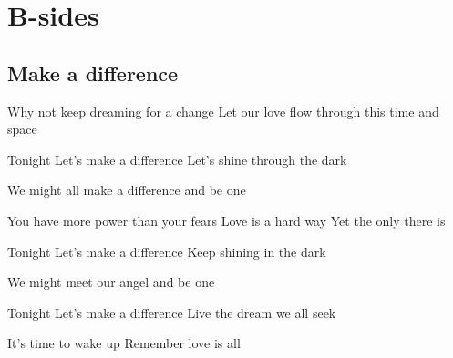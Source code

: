 \documentclass{article}
\newenvironment{album}[1]%
{%
  \section*{#1}
}%
{%
}
\newenvironment{song}[1]%
{%
  \subsection*{\textbf{#1}}
  \begin{multicols*}{2}
}%
{%
  \end{multicols*}
  \newpage
}
\newenvironment{couplet} %
{%
  \verbatim
}%
{% end code
  \endverbatim
}
\newenvironment{refrain} %
{%
  \verbatim
}%
{% end code
  \endverbatim
}
\begin{document}
\begin{album}{B-sides}

\begin{song}{Make a difference}
\begin{couplet}
Why not keep dreaming for a change
Let our love flow through this time and space
\end{couplet}
\begin{refrain}
Tonight
Let's make a difference
Let's shine through the dark

We might
all make a difference
and be one
\end{refrain}
\begin{couplet}
You have more power than your fears
Love is a hard way
Yet the only there is
\end{couplet}
\begin{refrain}
Tonight
Let's make a difference
Keep shining in the dark

We might
meet our angel
and be one
\end{refrain}
\begin{refrain}
Tonight
Let's make a difference
Live the dream we all seek

It's time to wake up
Remember love is all
\end{refrain}
\end{song}


\end{album}
\end{document}
